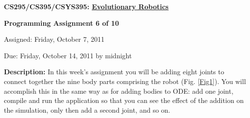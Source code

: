 \documentclass[12pt]{article}
\begin{document}
\centerline{\bf \Large CS295/CS395/CSYS395: \href{CS295_395_Syllabus.pdf}{\underline{Evolutionary Robotics}}}

\vspace{0.5cm}

\centerline{\bf \large Programming Assignment 6 of 10}

\vspace{0.5cm}

\centerline{\large Assigned: Friday, October 7, 2011}

\vspace{0.5cm}

\centerline{\large Due: Friday, October 14, 2011 by midnight}

\vspace{0.5cm}

\noindent \textbf{Description:} In this week's assignment you will be adding eight joints to connect together the nine body parts comprising the robot (Fig. \ref{Fig1}). You will accomplish this in the same way as for adding bodies to ODE: add one joint, compile and run the application so that you can see the effect of the addition on the simulation, only then add a second joint, and so on.
\end{document}
